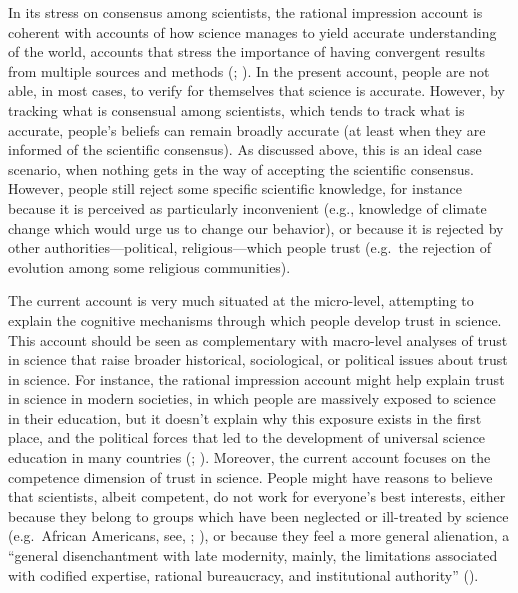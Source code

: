 \documentclass[
  jou,
  floatsintext,
  longtable,
  nolmodern,
  notxfonts,
  notimes,
  colorlinks=true,linkcolor=blue,citecolor=blue,urlcolor=blue]{apa7}
\begin{document}
In its stress on consensus among scientists, the rational impression
account is coherent with accounts of how science manages to yield
accurate understanding of the world, accounts that stress the importance
of having convergent results from multiple sources and methods
(; ).
In the present account, people are not able, in most cases, to verify
for themselves that science is accurate. However, by tracking what is
consensual among scientists, which tends to track what is accurate,
people's beliefs can remain broadly accurate (at least when they are
informed of the scientific consensus). As discussed above, this is an
ideal case scenario, when nothing gets in the way of accepting the
scientific consensus. However, people still reject some specific
scientific knowledge, for instance because it is perceived as
particularly inconvenient (e.g., knowledge of climate change which would
urge us to change our behavior), or because it is rejected by other
authorities---political, religious---which people trust (e.g.~the
rejection of evolution among some religious communities).~

The current account is very much situated at the micro-level, attempting
to explain the cognitive mechanisms through which people develop trust
in science. This account should be seen as complementary with
macro-level analyses of trust in science that raise broader historical,
sociological, or political issues about trust in science. For instance,
the rational impression account might help explain trust in science in
modern societies, in which people are massively exposed to science in
their education, but it doesn't explain why this exposure exists in the
first place, and the political forces that led to the development of
universal science education in many countries
(;
).
Moreover, the current account focuses on the competence dimension of
trust in science. People might have reasons to believe that scientists,
albeit competent, do not work for everyone's best interests, either
because they belong to groups which have been neglected or ill-treated
by science (e.g.~African Americans, see,
;
), or because they feel a more general alienation, a ``general
disenchantment with late modernity, mainly, the limitations associated
with codified expertise, rational bureaucracy, and institutional
authority'' ().
\end{document}
